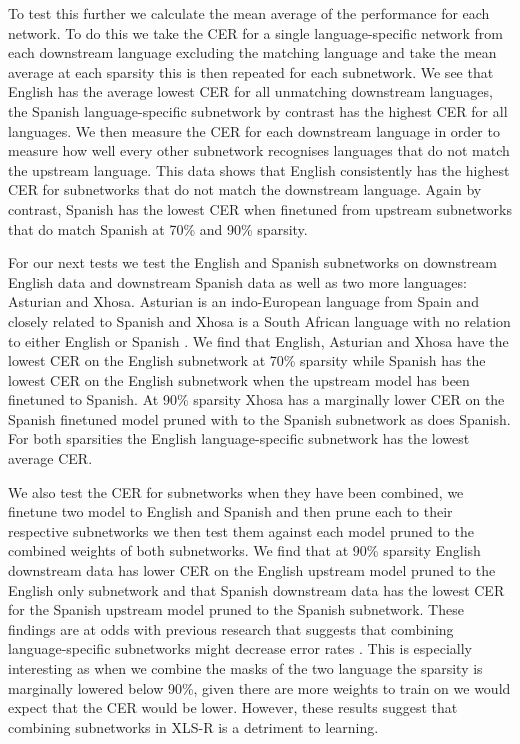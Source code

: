 To test this further we calculate the mean average of the performance for each network. To do this we take the CER for a single language-specific network from each downstream language excluding the matching language and take the mean average at each sparsity this is then repeated for each subnetwork. We see that English has the average lowest CER for all unmatching downstream languages, the Spanish language-specific subnetwork by contrast has the highest CER for all languages. We then measure the CER for each downstream language in order to measure how well every other subnetwork recognises languages that do not match the upstream language. This data shows that English consistently has the highest CER for subnetworks that do not match the downstream language. Again by contrast, Spanish has the lowest CER when finetuned from upstream subnetworks that do match Spanish at 70\% and 90\% sparsity.

For our next tests we test the English and Spanish subnetworks on downstream English data and downstream Spanish data as well as two more languages: Asturian and Xhosa. Asturian is an indo-European language from Spain and closely related to Spanish and Xhosa is a South African language with no relation to either English or Spanish \cite{bauer2007linguistics}. We find that English, Asturian and Xhosa have the lowest CER on the English subnetwork at 70\% sparsity while Spanish has the lowest CER on the English subnetwork when the upstream model has been finetuned to Spanish. At 90\% sparsity Xhosa has a marginally lower CER on the Spanish finetuned model pruned with to the Spanish subnetwork as does Spanish. For both sparsities the English language-specific subnetwork has the lowest average CER. 

We also test the CER for subnetworks when they have been combined, we finetune two model to English and Spanish and then prune each to their respective subnetworks we then test them against each model pruned to the combined weights of both subnetworks. We find that at 90\% sparsity English downstream data has lower CER on the English upstream model pruned to the English only subnetwork and that Spanish downstream data has the lowest CER for the Spanish upstream model pruned to the Spanish subnetwork. These findings are at odds with previous research that suggests that combining language-specific subnetworks might decrease error rates \cite{Lu_Language_adap_xlsr, yang2023learning}. This is especially interesting as when we combine the masks of the two language the sparsity is marginally lowered below 90\%, given there are more weights to train on we would expect that the CER would be lower. However, these results suggest that combining subnetworks in XLS-R is a detriment to learning. 

